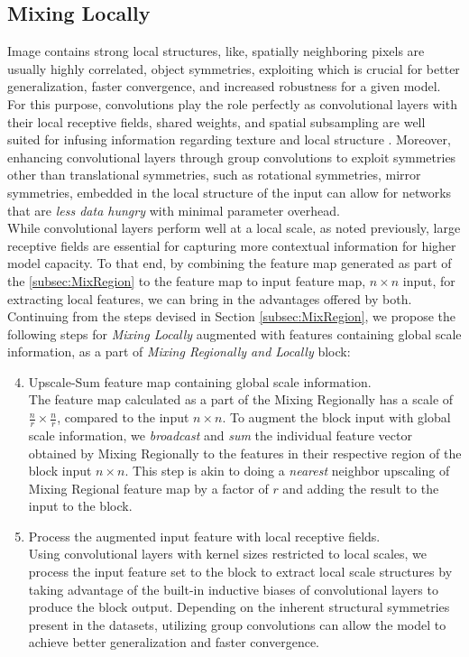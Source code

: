 \documentclass{article}
\begin{document}
\subsection{Mixing Locally} \label{subsec:MixLocal}
Image contains strong local structures, like, spatially neighboring pixels are usually highly correlated, object symmetries, exploiting which is crucial for better generalization, faster convergence, and increased robustness for a given model. For this purpose, convolutions play the role perfectly as convolutional layers with their local receptive fields, shared weights, and spatial subsampling \cite{LeCun1999} are well suited for infusing information regarding texture and local structure \cite{DBLP:journals/corr/texture-bias}. Moreover, enhancing convolutional layers through group convolutions \cite{DBLP:journals/corr/CohenW16, DSF-CNN} to exploit symmetries other than translational symmetries, such as rotational symmetries, mirror symmetries, embedded in the local structure of the input can allow for networks that are \textit{less data hungry} with minimal parameter overhead. \\
\indent While convolutional layers perform well at a local scale, as noted previously, large receptive fields are essential for capturing more contextual information for higher model capacity. To that end, by combining the feature map generated as part of the \ref{subsec:MixRegion} to the feature map to input feature map,  $n \times n$ input, for extracting local features, we can bring in the advantages offered by both. \\
Continuing from the steps devised in Section \ref{subsec:MixRegion}, we propose the following steps for \textit{Mixing Locally} augmented with features containing global scale information, as a part of \textit{Mixing Regionally and Locally} block:
\begin{enumerate}
\setcounter{enumi}{3}
    \item Upscale-Sum feature map containing global scale information.\label{step:4} \\
    The feature map calculated as a part of the Mixing Regionally has a scale of $\frac{n}{r} \times \frac{n}{r}$, compared to the input $n \times n$. To augment the block input with global scale information, we \textit{broadcast} and \textit{sum} the individual feature vector obtained by Mixing Regionally to the features in their respective region of the block input $n \times n$. This step is akin to doing a \textit{nearest} neighbor upscaling of Mixing Regional feature map by a factor of $r$ and adding the result to the input to the block. 
    \item Process the augmented input feature with local receptive fields. \\
    Using convolutional layers with kernel sizes restricted to local scales, we process the input feature set to the block to extract local scale structures by taking advantage of the built-in inductive biases of convolutional layers to produce the block output. Depending on the inherent structural symmetries present in the datasets, utilizing group convolutions can allow the model to achieve better generalization and faster convergence.  
\end{enumerate}
\end{document}
